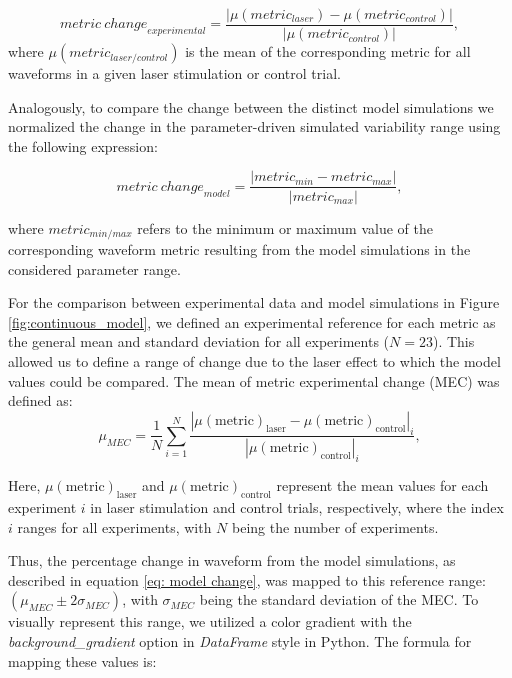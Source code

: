\begin{equation}
	{metric\ change}_{experimental} = \frac{|\mu(metric_{laser}) - \mu(metric_{control})|}{|\mu(metric_{control})|},
\end{equation}
\noindent where $\mu(metric_{laser/control})$ is the mean of the corresponding metric for all waveforms in a given laser stimulation or control trial.

Analogously, to compare the change between the distinct model simulations we normalized the change in the parameter-driven simulated variability range using the following expression:

\begin{equation}
	\label{eq: model change}
	{metric\ change}_{model} = \frac{|metric_{min} - metric_{max}|}{|metric_{max}|},
\end{equation}

\noindent where $metric_{min/max}$ refers to the minimum or maximum value of the corresponding waveform metric resulting from the model simulations in the  considered parameter range.


For the comparison between experimental data and model simulations in Figure \ref{fig:continuous_model}, we defined an experimental reference for each metric as the general mean and standard deviation for all experiments ($N=23$). This allowed us to define a range of change due to the laser effect to which the model values could be compared. The mean of metric experimental change (MEC) was defined as:
\begin{equation}
	\mu_{MEC} = \frac{1}{N}\sum_{i=1}^{N}\frac{|\mu(\text{metric})_{\text{laser}} - \mu(\text{metric})_{\text{control}}|_{i}}{|\mu(\text{metric})_{\text{control}}|_{i}},
\end{equation}

Here, $\mu(\text{metric})_{\text{laser}}$ and $\mu(\text{metric})_{\text{control}}$ represent the mean values for each experiment $i$ in laser stimulation and control trials, respectively, where the index $i$ ranges for all experiments, with $N$ being the number of experiments.

Thus, the percentage change in waveform from the model simulations, as described in equation \ref{eq: model change}, was mapped to this reference range: $(\mu_{MEC}\pm2\sigma_{MEC})$, with $\sigma_{MEC}$ being the standard deviation of the MEC. To visually represent this range, we utilized a color gradient with the \textit{background\_gradient} option in \textit{DataFrame} style in Python. The formula for mapping these values is:

